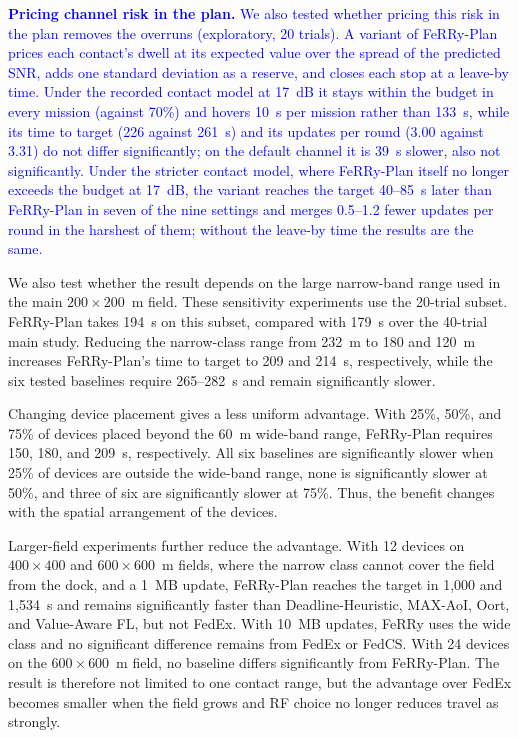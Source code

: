\documentclass[conference]{IEEEtran}
\newcommand{\sysname}{FeRRy}
\begin{document}
\textcolor{blue}{\textbf{Pricing channel risk in the plan.} We also tested
whether pricing this risk in the plan removes the overruns (exploratory, 20
trials). A variant of \sysname{}-Plan prices each contact's dwell at its expected
value over the spread of the predicted SNR, adds one standard deviation as a
reserve, and closes each stop at a leave-by time. Under the recorded contact
model at 17~dB it stays within the budget in every mission (against 70\%) and
hovers 10~s per mission rather than 133~s, while its time to target (226
against 261~s) and its updates per round (3.00 against 3.31) do not differ
significantly; on the default channel it is 39~s slower, also not
significantly. Under the stricter contact model, where \sysname{}-Plan itself
no longer exceeds the budget at 17~dB, the variant reaches the target 40--85~s
later than \sysname{}-Plan in seven of the nine settings and merges 0.5--1.2
fewer updates per round in the harshest of them; without the leave-by time the
results are the same.}

We also test whether the result depends on the large narrow-band range used in
the main \(200\times200\)~m field. These sensitivity experiments use the
20-trial subset. \sysname{}-Plan takes 194~s on this subset, compared with
179~s over the 40-trial main study. Reducing the narrow-class range from
232~m to 180 and 120~m increases \sysname{}-Plan's time to target to 209 and
214~s, respectively, while the six tested baselines require 265--282~s and
remain significantly slower.

Changing device placement gives a less uniform advantage. With 25\%, 50\%, and
75\% of devices placed beyond the 60~m wide-band range, \sysname{}-Plan
requires 150, 180, and 209~s, respectively. All six baselines are significantly
slower when 25\% of devices are outside the wide-band range, none is
significantly slower at 50\%, and three of six are significantly slower at
75\%. Thus, the benefit changes with the spatial arrangement of the devices.

Larger-field experiments further reduce the advantage. With 12 devices on
\(400\times400\) and \(600\times600\)~m fields, where the narrow class cannot
cover the field from the dock, and a 1~MB update, \sysname{}-Plan reaches the
target in 1,000 and 1,534~s and remains significantly faster than
Deadline-Heuristic, MAX-AoI, Oort, and Value-Aware FL, but not FedEx. With
10~MB updates, \sysname{} uses the wide class and no significant difference
remains from FedEx or FedCS. With 24 devices on the
\(600\times600\)~m field, no baseline differs significantly from
\sysname{}-Plan. The result is therefore not limited to one contact range, but
the advantage over FedEx becomes smaller when the field grows and RF choice no
longer reduces travel as strongly.
\end{document}
